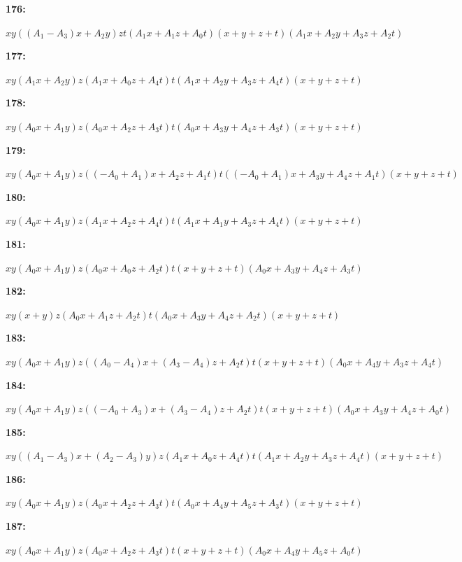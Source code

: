 \documentclass[12pt]{amsart}
\theoremstyle{plain}
\theoremstyle{remark}
\theoremstyle{definition}
\numberwithin{table}{section}
\begin{document}
\noindent\parbox[right]{9mm}{\textbf{176:}}\parbox{3mm}{\hfill}%
\parbox[t]{15cm}{\(xy((A_{1} - A_{3})x + A_{2}y)zt(A_{1}x + A_{1}z + A_{0}t)(x + y + z + t)(A_{1}x + A_{2}y + A_{3}z + A_{2}t)\)}

\noindent\parbox[right]{9mm}{\textbf{177:}}\parbox{3mm}{\hfill}%
\parbox[t]{15cm}{\(xy(A_{1}x + A_{2}y)z(A_{1}x + A_{0}z + A_{4}t)t(A_{1}x + A_{2}y + A_{3}z + A_{4}t)(x + y + z + t)\)}

\noindent\parbox[right]{9mm}{\textbf{178:}}\parbox{3mm}{\hfill}%
\parbox[t]{15cm}{\(xy(A_{0}x + A_{1}y)z(A_{0}x + A_{2}z + A_{3}t)t(A_{0}x + A_{3}y + A_{4}z + A_{3}t)(x + y + z + t)\)}

\noindent\parbox[right]{9mm}{\textbf{179:}}\parbox{3mm}{\hfill}%
\parbox[t]{15cm}{\(xy(A_{0}x + A_{1}y)z((-A_{0} + A_{1})x + A_{2}z + A_{1}t)t((-A_{0} + A_{1})x + A_{3}y + A_{4}z + A_{1}t)(x + y + z + t)\)}

\noindent\parbox[right]{9mm}{\textbf{180:}}\parbox{3mm}{\hfill}%
\parbox[t]{15cm}{\(xy(A_{0}x + A_{1}y)z(A_{1}x + A_{2}z + A_{4}t)t(A_{1}x + A_{1}y + A_{3}z + A_{4}t)(x + y + z + t)\)}

\noindent\parbox[right]{9mm}{\textbf{181:}}\parbox{3mm}{\hfill}%
\parbox[t]{15cm}{\(xy(A_{0}x + A_{1}y)z(A_{0}x + A_{0}z + A_{2}t)t(x + y + z + t)(A_{0}x + A_{3}y + A_{4}z + A_{3}t)\)}

\noindent\parbox[right]{9mm}{\textbf{182:}}\parbox{3mm}{\hfill}%
\parbox[t]{15cm}{\(xy(x + y)z(A_{0}x + A_{1}z + A_{2}t)t(A_{0}x + A_{3}y + A_{4}z + A_{2}t)(x + y + z + t)\)}

\noindent\parbox[right]{9mm}{\textbf{183:}}\parbox{3mm}{\hfill}%
\parbox[t]{15cm}{\(xy(A_{0}x + A_{1}y)z((A_{0} - A_{4})x + (A_{3} - A_{4})z + A_{2}t)t(x + y + z + t)(A_{0}x + A_{4}y + A_{3}z + A_{4}t)\)}

\noindent\parbox[right]{9mm}{\textbf{184:}}\parbox{3mm}{\hfill}%
\parbox[t]{15cm}{\(xy(A_{0}x + A_{1}y)z((-A_{0} + A_{3})x + (A_{3} - A_{4})z + A_{2}t)t(x + y + z + t)(A_{0}x + A_{3}y + A_{4}z + A_{0}t)\)}

\noindent\parbox[right]{9mm}{\textbf{185:}}\parbox{3mm}{\hfill}%
\parbox[t]{15cm}{\(xy((A_{1} - A_{3})x + (A_{2} - A_{3})y)z(A_{1}x + A_{0}z + A_{4}t)t(A_{1}x + A_{2}y + A_{3}z + A_{4}t)(x + y + z + t)\)}

\noindent\parbox[right]{9mm}{\textbf{186:}}\parbox{3mm}{\hfill}%
\parbox[t]{15cm}{\(xy(A_{0}x + A_{1}y)z(A_{0}x + A_{2}z + A_{3}t)t(A_{0}x + A_{4}y + A_{5}z + A_{3}t)(x + y + z + t)\)}

\noindent\parbox[right]{9mm}{\textbf{187:}}\parbox{3mm}{\hfill}%
\parbox[t]{15cm}{\(xy(A_{0}x + A_{1}y)z(A_{0}x + A_{2}z + A_{3}t)t(x + y + z + t)(A_{0}x + A_{4}y + A_{5}z + A_{0}t)\)}
\end{document}
